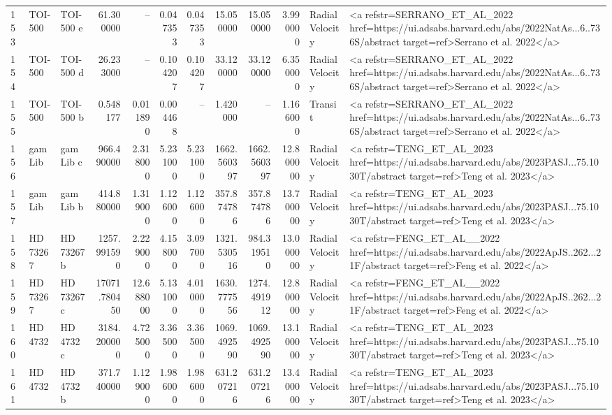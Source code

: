 \begin{tabular}{lllrrrrrrrll}
153 & TOI-500 & TOI-500 e & 61.300000 & -- & 0.047353 & 0.047353 & 15.050000 & 15.050000 & 3.990000 & Radial Velocity & <a refstr=SERRANO_ET_AL_2022 href=https://ui.adsabs.harvard.edu/abs/2022NatAs...6..736S/abstract target=ref>Serrano et al. 2022</a> \\
154 & TOI-500 & TOI-500 d & 26.233000 & -- & 0.104207 & 0.104207 & 33.120000 & 33.120000 & 6.350000 & Radial Velocity & <a refstr=SERRANO_ET_AL_2022 href=https://ui.adsabs.harvard.edu/abs/2022NatAs...6..736S/abstract target=ref>Serrano et al. 2022</a> \\
155 & TOI-500 & TOI-500 b & 0.548177 & 0.011890 & 0.004468 & -- & 1.420000 & -- & 1.166000 & Transit & <a refstr=SERRANO_ET_AL_2022 href=https://ui.adsabs.harvard.edu/abs/2022NatAs...6..736S/abstract target=ref>Serrano et al. 2022</a> \\
156 & gam Lib & gam Lib c & 966.490000 & 2.318000 & 5.231000 & 5.231000 & 1662.560397 & 1662.560397 & 12.800000 & Radial Velocity & <a refstr=TENG_ET_AL_2023 href=https://ui.adsabs.harvard.edu/abs/2023PASJ...75.1030T/abstract target=ref>Teng et al. 2023</a> \\
157 & gam Lib & gam Lib b & 414.880000 & 1.319000 & 1.126000 & 1.126000 & 357.874786 & 357.874786 & 13.700000 & Radial Velocity & <a refstr=TENG_ET_AL_2023 href=https://ui.adsabs.harvard.edu/abs/2023PASJ...75.1030T/abstract target=ref>Teng et al. 2023</a> \\
158 & HD 73267 & HD 73267 b & 1257.991590 & 2.229000 & 4.158000 & 3.097000 & 1321.530516 & 984.319510 & 13.000000 & Radial Velocity & <a refstr=FENG_ET_AL__2022 href=https://ui.adsabs.harvard.edu/abs/2022ApJS..262...21F/abstract target=ref>Feng et al. 2022</a> \\
159 & HD 73267 & HD 73267 c & 17071.780450 & 12.688000 & 5.131000 & 4.010000 & 1630.777556 & 1274.491912 & 12.800000 & Radial Velocity & <a refstr=FENG_ET_AL__2022 href=https://ui.adsabs.harvard.edu/abs/2022ApJS..262...21F/abstract target=ref>Feng et al. 2022</a> \\
160 & HD 4732 & HD 4732 c & 3184.200000 & 4.725000 & 3.365000 & 3.365000 & 1069.492590 & 1069.492590 & 13.100000 & Radial Velocity & <a refstr=TENG_ET_AL_2023 href=https://ui.adsabs.harvard.edu/abs/2023PASJ...75.1030T/abstract target=ref>Teng et al. 2023</a> \\
161 & HD 4732 & HD 4732 b & 371.740000 & 1.129000 & 1.986000 & 1.986000 & 631.207216 & 631.207216 & 13.400000 & Radial Velocity & <a refstr=TENG_ET_AL_2023 href=https://ui.adsabs.harvard.edu/abs/2023PASJ...75.1030T/abstract target=ref>Teng et al. 2023</a> \\

\end{tabular}
